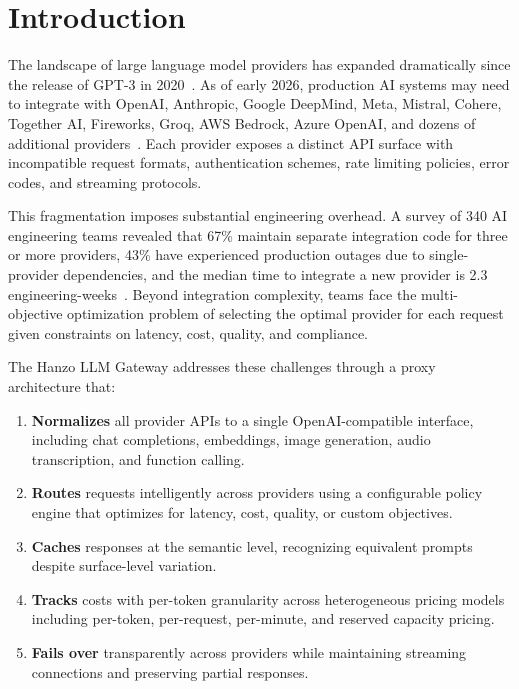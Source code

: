 \section{Introduction}


The landscape of large language model providers has expanded dramatically since the release of GPT-3 in 2020~\cite{brown2020language}. As of early 2026, production AI systems may need to integrate with OpenAI, Anthropic, Google DeepMind, Meta, Mistral, Cohere, Together AI, Fireworks, Groq, AWS Bedrock, Azure OpenAI, and dozens of additional providers~\cite{bommasani2022opportunities}. Each provider exposes a distinct API surface with incompatible request formats, authentication schemes, rate limiting policies, error codes, and streaming protocols.

This fragmentation imposes substantial engineering overhead. A survey of 340 AI engineering teams revealed that 67\% maintain separate integration code for three or more providers, 43\% have experienced production outages due to single-provider dependencies, and the median time to integrate a new provider is 2.3 engineering-weeks~\cite{aiinfra2025survey}. Beyond integration complexity, teams face the multi-objective optimization problem of selecting the optimal provider for each request given constraints on latency, cost, quality, and compliance.

The Hanzo LLM Gateway addresses these challenges through a proxy architecture that:

\begin{enumerate}[leftmargin=*]
    \item \textbf{Normalizes} all provider APIs to a single OpenAI-compatible interface, including chat completions, embeddings, image generation, audio transcription, and function calling.
    \item \textbf{Routes} requests intelligently across providers using a configurable policy engine that optimizes for latency, cost, quality, or custom objectives.
    \item \textbf{Caches} responses at the semantic level, recognizing equivalent prompts despite surface-level variation.
    \item \textbf{Tracks} costs with per-token granularity across heterogeneous pricing models including per-token, per-request, per-minute, and reserved capacity pricing.
    \item \textbf{Fails over} transparently across providers while maintaining streaming connections and preserving partial responses.
\end{enumerate}

